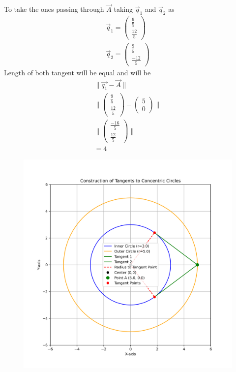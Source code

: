 \documentclass[a5paper,10pt]{article}
\begin{document}
To take the ones passing through $\vec{A}$ taking $\vec{q}_1$ and $\vec{q}_2$ as
\begin{align}
\vec{q}_1=\begin{pmatrix}\frac{9}{5}\\ \frac{12}{5}\end{pmatrix}\\
\vec{q}_2=\begin{pmatrix}\frac{9}{5}\\ \frac{-12}{5}\end{pmatrix}    
\end{align}
Length of both tangent will be equal and will be
\begin{align}
    \lVert \vec{q_1}-\vec{A} \rVert\\
    \lVert \begin{pmatrix}\frac{9}{5}\\ \frac{12}{5}\end{pmatrix} -\begin{pmatrix}5\\0\end{pmatrix}\rVert\\
    \lVert \begin{pmatrix}\frac{-16}{5}\\ \frac{12}{5}\end{pmatrix}\rVert\\
    =4
\end{align}
\begin{figure}[H]
    \centering
    \includegraphics[width=\columnwidth]{figs/figure.png}
    \caption{}
    \label{fig:placeholder}
\end{figure}
\end{document}
